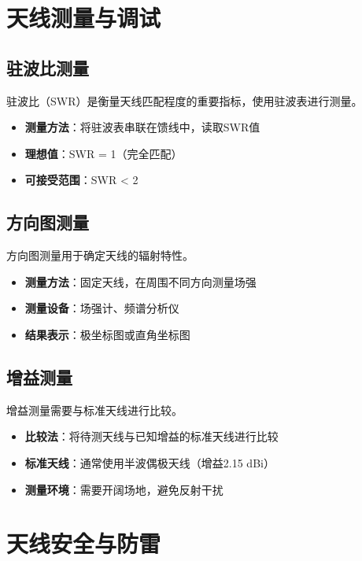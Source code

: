 \section{天线测量与调试}
\label{sec:antenna_measurement}

\subsection{驻波比测量}
\label{sec:swr_measurement}

驻波比（SWR）是衡量天线匹配程度的重要指标，使用驻波表进行测量。

\begin{itemize}
    \item \textbf{测量方法}：将驻波表串联在馈线中，读取SWR值
    \item \textbf{理想值}：SWR = 1（完全匹配）
    \item \textbf{可接受范围}：SWR < 2
\end{itemize}

\subsection{方向图测量}
\label{sec:pattern_measurement}

方向图测量用于确定天线的辐射特性。

\begin{itemize}
    \item \textbf{测量方法}：固定天线，在周围不同方向测量场强
    \item \textbf{测量设备}：场强计、频谱分析仪
    \item \textbf{结果表示}：极坐标图或直角坐标图
\end{itemize}

\subsection{增益测量}
\label{sec:gain_measurement}

增益测量需要与标准天线进行比较。

\begin{itemize}
    \item \textbf{比较法}：将待测天线与已知增益的标准天线进行比较
    \item \textbf{标准天线}：通常使用半波偶极天线（增益2.15 dBi）
    \item \textbf{测量环境}：需要开阔场地，避免反射干扰
\end{itemize}

\section{天线安全与防雷}
\label{sec:antenna_safety}

